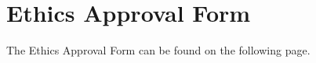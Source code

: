 \chapter{Ethics Approval Form}\label{appendix:ethics}

The Ethics Approval Form can be found on the following page.
